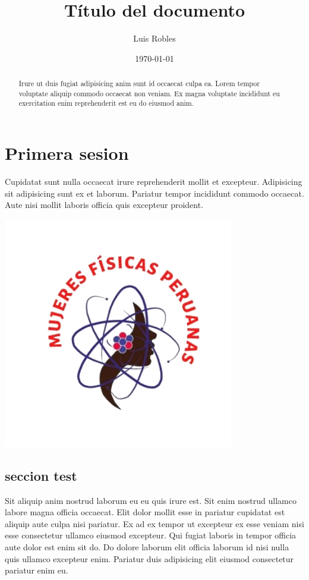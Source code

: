 \documentclass{article}
\title{Título del documento}
\author{Luis Robles}
\date{\today}
\begin{document}
\maketitle

\begin{abstract}
Irure ut duis fugiat adipisicing anim sunt id occaecat culpa ea. Lorem tempor voluptate aliquip commodo occaecat non veniam. Ex magna voluptate incididunt eu exercitation enim reprehenderit est eu do eiusmod anim.
\end{abstract}


\section{Primera sesion}
Cupidatat sunt nulla occaecat irure reprehenderit mollit et excepteur. Adipisicing sit adipisicing sunt ex et laborum. Pariatur tempor incididunt commodo occaecat. Aute nisi mollit laboris officia quis excepteur proident.

\includegraphics{img/logoMFP.png}

\subsection{seccion test}
Sit aliquip anim nostrud laborum eu eu quis irure est. Sit enim nostrud ullamco labore magna officia occaecat. Elit dolor mollit esse in pariatur cupidatat est aliquip aute culpa nisi pariatur. Ex ad ex tempor ut excepteur ex esse veniam nisi esse consectetur ullamco eiusmod excepteur. Qui fugiat laboris in tempor officia aute dolor est enim sit do. Do dolore laborum elit officia laborum id nisi nulla quis ullamco excepteur enim. Pariatur duis adipisicing elit eiusmod consectetur pariatur enim eu.
\end{document}
